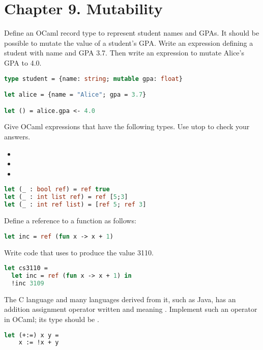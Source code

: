 \section*{Chapter 9. Mutability}

Define an OCaml record type to represent student names and GPAs. It should be possible to mutate the value of a student's
GPA. Write an expression defining a student with name  and GPA 3.7. Then write an expression to mutate
Alice's GPA to 4.0.

\begin{lstlisting}[language=OCaml]
type student = {name: string; mutable gpa: float}

let alice = {name = "Alice"; gpa = 3.7}

let () = alice.gpa <- 4.0
\end{lstlisting}

\problem[refs]
Give OCaml expressions that have the following types. Use utop to check your answers.
\begin{itemize}
	\item {}
	\item {}
	\item {}
\end{itemize}

\begin{lstlisting}[language=OCaml]
let (_ : bool ref) = ref true
let (_ : int list ref) = ref [5;3]
let (_ : int ref list) = [ref 5; ref 3]
\end{lstlisting}

Define a reference to a function as follows:
\begin{lstlisting}[language=OCaml]
let inc = ref (fun x -> x + 1)
\end{lstlisting}
Write code that uses  to produce the value 3110.

\begin{lstlisting}[language=OCaml]
let cs3110 =
  let inc = ref (fun x -> x + 1) in
  !inc 3109
\end{lstlisting}

The C language and many languages derived from it, such as Java, has an addition assignment operator written  and meaning . Implement such an operator in OCaml; its type should be .

\begin{lstlisting}[language=OCaml]
let (+:=) x y = 
	x := !x + y
\end{lstlisting}

